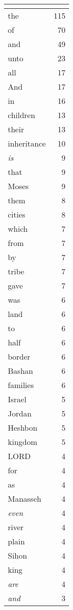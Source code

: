 \begin{center}
\begin{longtable}{l|r}
\hline \multicolumn{2}{c}{{ }} \\ \hline
\endfoot 
the & 115\\ \hline 
of & 70\\ \hline 
and & 49\\ \hline 
unto & 23\\ \hline 
all & 17\\ \hline 
And & 17\\ \hline 
in & 16\\ \hline 
children & 13\\ \hline 
their & 13\\ \hline 
inheritance & 10\\ \hline 
\emph{is} & 9\\ \hline 
that & 9\\ \hline 
Moses & 9\\ \hline 
them & 8\\ \hline 
cities & 8\\ \hline 
which & 7\\ \hline 
from & 7\\ \hline 
by & 7\\ \hline 
tribe & 7\\ \hline 
gave & 7\\ \hline 
was & 6\\ \hline 
land & 6\\ \hline 
to & 6\\ \hline 
half & 6\\ \hline 
border & 6\\ \hline 
Bashan & 6\\ \hline 
families & 6\\ \hline 
Israel & 5\\ \hline 
Jordan & 5\\ \hline 
Heshbon & 5\\ \hline 
kingdom & 5\\ \hline 
LORD & 4\\ \hline 
for & 4\\ \hline 
as & 4\\ \hline 
Manasseh & 4\\ \hline 
\emph{even} & 4\\ \hline 
river & 4\\ \hline 
plain & 4\\ \hline 
Sihon & 4\\ \hline 
king & 4\\ \hline 
\emph{are} & 4\\ \hline 
\emph{and} & 3\\ \hline 

\end{longtable}
\end{center}
